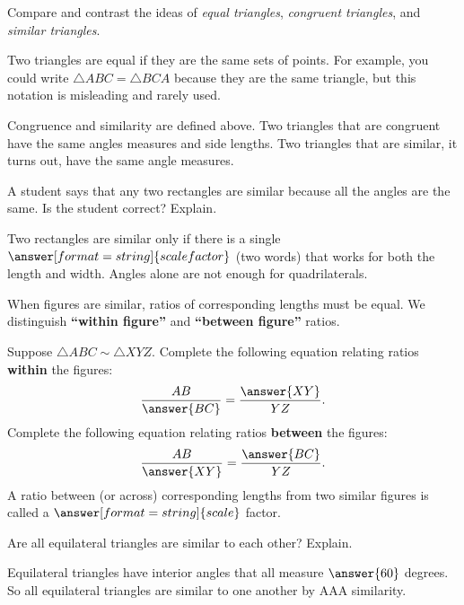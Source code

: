\documentclass[nooutcomes]{ximera}
\begin{document}
\begin{question}
Compare and contrast the ideas of \textit{equal triangles},
  \textit{congruent triangles}, and \textit{similar triangles}.
\begin{freeResponse}
\end{freeResponse}
\begin{hint}
Two triangles are equal if they are the same sets of points.  For example, you could write $\triangle ABC = \triangle BCA$ because they are the same triangle, but this notation is misleading and rarely used.  

Congruence and similarity are defined above.  Two triangles that are congruent have the same angles measures and side lengths.  Two triangles that are similar, it turns out, have the same angle measures.  
\end{hint}
\end{question}

\begin{question}
A student says that any two rectangles are similar because all the angles are the same.  Is the student correct?  
 Explain. 
\begin{question}
Two rectangles are similar only if there is a single $\answer[format=string]{scale factor}$ (two words) that works for both the length and width.  Angles alone are not enough for quadrilaterals.  
\end{question}
\end{question}

\begin{question}When figures are similar, ratios of corresponding lengths must be equal.  We distinguish \textbf{``within figure''} and \textbf{``between figure''} ratios.  
 
Suppose $\triangle ABC \sim \triangle XYZ$.  Complete the following equation relating ratios \textbf{within} the figures: 
\[
\frac{AB}{\answer{BC}} = \frac{\answer{XY}}{YZ}.  
\]
Complete the following equation relating ratios \textbf{between} the figures: 
\[
\frac{AB}{\answer{XY}} = \frac{\answer{BC}}{YZ}.  
\]
A ratio between (or across) corresponding lengths from two similar figures is 
called a $\answer[format=string]{scale}$ factor.  
\end{question}


\begin{question}
Are all equilateral triangles are similar to each other?  
 Explain.  
\begin{question}
Equilateral triangles have interior angles that all measure $\answer{60}$ degrees.  So all equilateral triangles are similar to one another by AAA similarity.  
\end{question}
\end{question}
\end{document}
